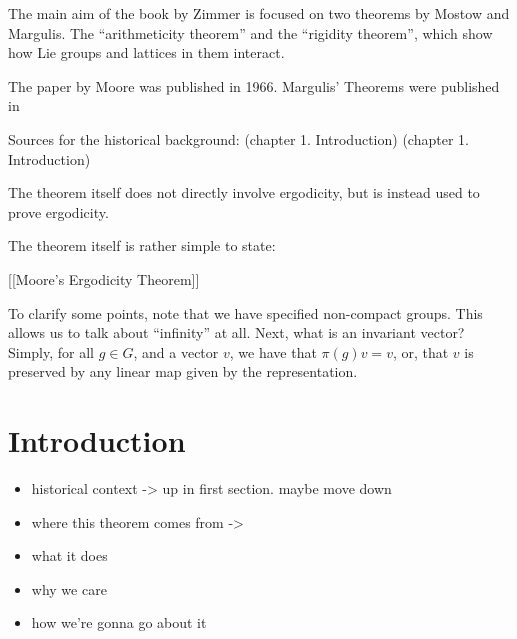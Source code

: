 \documentclass[
  12pt
]{article}
\theoremstyle{break}
\theoremstyle{plain}
\begin{document}
  The main aim of the book by Zimmer is focused on two
  theorems by Mostow and Margulis. The ``arithmeticity theorem'' and the
  ``rigidity theorem'', which show how Lie groups and lattices in them
  interact. 


  The paper by Moore \cite{Moore66} was published in 1966. Margulis' Theorems were published in 

  Sources for the historical background: \cite{mackey74}(chapter 1.
  Introduction) \cite{Zimmer84}(chapter 1. Introduction)

  The theorem itself does not directly involve ergodicity, but is instead
  used to prove ergodicity.

  The theorem itself is rather simple to state:

  {[}{[}Moore's Ergodicity Theorem{]}{]}

  To clarify some points, note that we have specified non-compact groups.
  This allows us to talk about ``infinity'' at all. Next, what is an
  invariant vector? Simply, for all $g\in G$, and a vector $v$, we
  have that $\pi(g)v = v$, or, that $v$ is preserved by any linear map
  given by the representation.





\hypertarget{introduction}{\section{Introduction}\label{sec:introduction}}


  \begin{itemize}
    \item historical context -\textgreater{} up in first section. maybe move down
    \item where this theorem comes from -\textgreater{} \cite{howe79}
    \item what it does
    \item why we care
    \item how we're gonna go about it
  \end{itemize}
\end{document}
